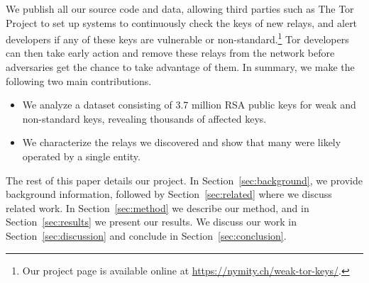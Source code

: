 We publish all our source code and data, allowing third parties such as The Tor
Project to set up systems to continuously check the keys of new relays, and
alert developers if any of these keys are vulnerable or
non-standard.\footnote{Our project page is available online at
\url{https://nymity.ch/weak-tor-keys/}.}  Tor developers can then take early
action and remove these relays from the network before adversaries get the
chance to take advantage of them.  In summary, we make the following two main
contributions.
\begin{itemize}
	\item We analyze a dataset consisting of 3.7 million RSA public keys for
		weak and non-standard keys, revealing thousands of affected keys.

	\item We characterize the relays we discovered and show that many were
		likely operated by a single entity.
\end{itemize}

The rest of this paper details our project.  In Section~\ref{sec:background}, we
provide background information, followed by Section~\ref{sec:related} where we 
discuss related work.  In Section~\ref{sec:method} we describe our method,
and in Section~\ref{sec:results} we present our results.  We discuss our work in
Section~\ref{sec:discussion} and conclude in Section~\ref{sec:conclusion}.
